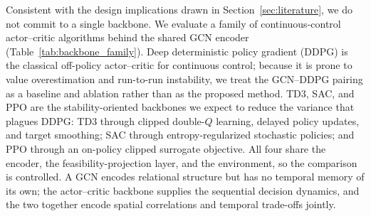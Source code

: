 \documentclass[preprint,review,12pt,nonatbib]{elsarticle}
\providecommand{\DIFadd}[1]{{\protect\color{blue}#1}} %
\providecommand{\DIFdel}[1]{} %
\providecommand{\DIFaddbegin}{} %
\providecommand{\DIFaddend}{} %
\providecommand{\DIFdelbegin}{} %
\providecommand{\DIFdelend}{} %
\providecommand{\DIFscaledelfig}{0.5}
\newlength{\DIFdelgraphicswidth} %
\newlength{\DIFdelgraphicsheight} %
\providecommand{\DIFaddincludegraphics}[2][]{{\color{blue}\fbox{\DIFOincludegraphics[#1]{#2}}}} %
\providecommand{\DIFdelincludegraphics}[2][]{%
\sbox{\DIFdelgraphicsbox}{\DIFOincludegraphics[#1]{#2}}%
\settoboxwidth{\DIFdelgraphicswidth}{\DIFdelgraphicsbox} %
\settoboxtotalheight{\DIFdelgraphicsheight}{\DIFdelgraphicsbox} %
\scalebox{\DIFscaledelfig}{%
\parbox[b]{\DIFdelgraphicswidth}{\usebox{\DIFdelgraphicsbox}\\[-\baselineskip] \rule{\DIFdelgraphicswidth}{0em}}\llap{\resizebox{\DIFdelgraphicswidth}{\DIFdelgraphicsheight}{%
\setlength{\unitlength}{\DIFdelgraphicswidth}%
\begin{picture}(1,1)%
\thicklines\linethickness{2pt} %
{\color[rgb]{1,0,0}\put(0,0){\framebox(1,1){}}}%
{\color[rgb]{1,0,0}\put(0,0){\line( 1,1){1}}}%
{\color[rgb]{1,0,0}\put(0,1){\line(1,-1){1}}}%
\end{picture}%
}\hspace*{3pt}}} %
} %
\DeclareRobustCommand{\DIFaddbegin}{\DIFOaddbegin \let\includegraphics\DIFaddincludegraphics} %
\DeclareRobustCommand{\DIFaddend}{\DIFOaddend \let\includegraphics\DIFOincludegraphics} %
\DeclareRobustCommand{\DIFdelbegin}{\DIFOdelbegin \let\includegraphics\DIFdelincludegraphics} %
\DeclareRobustCommand{\DIFdelend}{\DIFOaddend \let\includegraphics\DIFOincludegraphics} %
\begin{document}
\DIFdelbegin \DIFdel{The DDPGalgorithm is well suited }\DIFdelend \DIFaddbegin \DIFadd{Consistent with the design implications drawn in Section~\ref{sec:literature}, we do not commit to a single backbone. We evaluate a family of continuous-control actor--critic algorithms behind the shared GCN encoder (Table~\ref{tab:backbone_family}). Deep deterministic policy gradient (DDPG) is the classical off-policy actor--critic }\DIFaddend for continuous control\DIFdelbegin \DIFdel{problems, providing a model-free, off-policy }\DIFdelend \DIFaddbegin \DIFadd{; because it is prone to value overestimation and run-to-run instability, we treat the GCN--DDPG pairing as a baseline and ablation rather than as the proposed method. TD3, SAC, and PPO are the stability-oriented backbones we expect to reduce the variance that plagues DDPG: TD3 through clipped double-$Q$ learning, delayed policy updates, and target smoothing; SAC through entropy-regularized stochastic policies; and PPO through an on-policy clipped surrogate objective. All four share the encoder, the feasibility-projection layer, and the environment, so the comparison is controlled. A GCN encodes relational structure but has no temporal memory of its own; the }\DIFaddend actor--critic \DIFdelbegin \DIFdel{mechanism for policy learning. However, DDPG alone assumes vectorized
inputs and cannot directly leverage the relational information among facilities. Conversely, GCNs
excel at extracting structural embeddings from graph-structured data but lack temporal learning
capabilities. Their integration allows the model to }\DIFdelend \DIFaddbegin \DIFadd{backbone supplies the sequential decision dynamics, and the two together }\DIFaddend encode spatial correlations \DIFdelbegin \DIFdel{through GCN layers
and temporal decision dynamics through DDPGupdates. 
}\DIFdelend \DIFaddbegin \DIFadd{and temporal trade-offs jointly.
}\DIFaddend 
\end{document}
